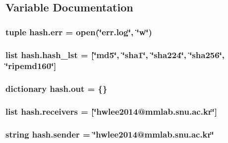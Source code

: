 \subsection{Variable Documentation}
\hypertarget{namespacehash_a3cb88d08c0a1af562d98d1643e2c91bc}{
\subsubsection[{err}]{\setlength{\rightskip}{0pt plus 5cm}tuple hash.\-err = open(\char`\"{}err.\-log\char`\"{}, \char`\"{}w\char`\"{})}}\label{namespacehash_a3cb88d08c0a1af562d98d1643e2c91bc}
\hypertarget{namespacehash_a33f714c152121382a0314f9687cc8e1b}{
\subsubsection[{hash\-\_\-lst}]{\setlength{\rightskip}{0pt plus 5cm}list hash.\-hash\-\_\-lst = \mbox{[}\char`\"{}md5\char`\"{}, \char`\"{}sha1\char`\"{}, \char`\"{}sha224\char`\"{}, \char`\"{}sha256\char`\"{}, \char`\"{}ripemd160\char`\"{}\mbox{]}}}\label{namespacehash_a33f714c152121382a0314f9687cc8e1b}
\hypertarget{namespacehash_a3bdcf340ebe26a29a908b0c139a5bde0}{
\subsubsection[{out}]{\setlength{\rightskip}{0pt plus 5cm}dictionary hash.\-out = \{\}}}\label{namespacehash_a3bdcf340ebe26a29a908b0c139a5bde0}
\hypertarget{namespacehash_a680457edb0628d619d64f3d080b23724}{
\subsubsection[{receivers}]{\setlength{\rightskip}{0pt plus 5cm}list hash.\-receivers = \mbox{[}\char`\"{}hwlee2014@mmlab.\-snu.\-ac.\-kr\char`\"{}\mbox{]}}}\label{namespacehash_a680457edb0628d619d64f3d080b23724}
\hypertarget{namespacehash_aa79adaa5d8408e6b071cfe2953502e78}{
\subsubsection[{sender}]{\setlength{\rightskip}{0pt plus 5cm}string hash.\-sender = \char`\"{}hwlee2014@mmlab.\-snu.\-ac.\-kr\char`\"{}}}\label{namespacehash_aa79adaa5d8408e6b071cfe2953502e78}
